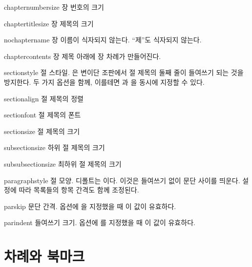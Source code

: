 \documentclass[minted]{hzguide}
\begin{document}
\begin{macros}
\item[chapternumbersize] \keyvalue{\HUGE}
장 번호의 크기

\item[chaptertitlesize] \keyvalue{\Huge}
장 제목의 크기 

\item[nochaptername] \keyvalueTF 
장 이름이 식자되지 않는다. ``제''도 식자되지 않는다.

\item[chaptercontents] \keyvalueTF
장 제목 아래에 장 차례가 만들어진다.

\item[sectionstyle] 
절 스타일. 은 변이단 조판에서 절 제목의 둘째 줄이 들여쓰기 되는 것을 방지한다.
두 가지 옵션을 함께, 이를테면 과 을 동시에 지정할 수 있다.

\item[sectionalign] \keyvalue{\raggedleft, \centering, \raggedright}
절 제목의 정렬

\item[sectionfont] \keyvalue{\normalfont\bfseries}
절 제목의 폰트

\item[sectionsize] \keyvalue{\Large}
절 제목의 크기

\item[subsectionsize] \keyvalue{\large}
하위 절 제목의 크기

\item[subsubsectionsize] \keyvalue{\normalsize}
최하위 절 제목의 크기

\item[paragraphstyle] 
절 모양. 디폴트는 이다. 이것은 들여쓰기 없이 문단 사이를 띄운다.
설정에 따라 목록들의 항목 간격도 함께 조정된다.

\item[parskip] \keyvalue{0.25\onelineskip}
문단 간격.  옵션에 을 지정했을 때 이 값이 유효하다.

\item[parindent] \keyvalue{1em}
들여쓰기 크기.  옵션에 를 지정했을 때 이 값이 유효하다.
\end{macros}

\section{차례와 북마크}
\end{document}
